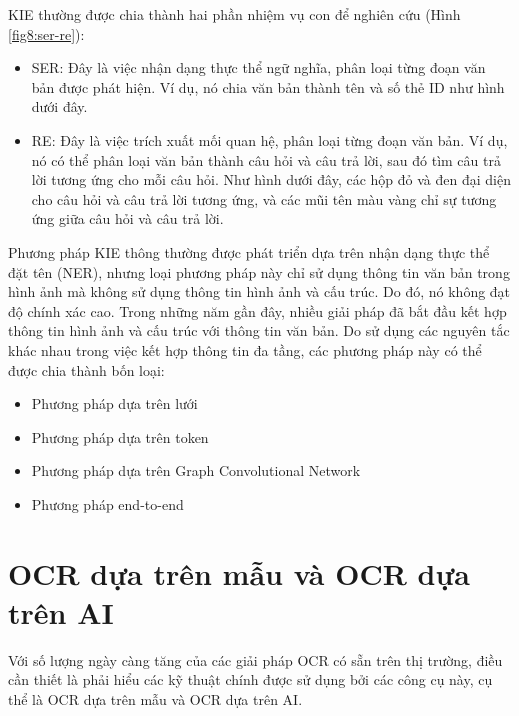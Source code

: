 KIE thường được chia thành hai phần nhiệm vụ con để nghiên cứu (Hình \ref{fig8:ser-re}):
\begin{itemize}
    \item SER: Đây là việc nhận dạng thực thể ngữ nghĩa, phân loại từng đoạn văn bản được phát hiện. Ví dụ, nó chia văn bản thành tên và số thẻ ID như hình dưới đây.
    \item RE: Đây là việc trích xuất mối quan hệ, phân loại từng đoạn văn bản. Ví dụ, nó có thể phân loại văn bản thành câu hỏi và câu trả lời, sau đó tìm câu trả lời tương ứng cho mỗi câu hỏi. Như hình dưới đây, các hộp đỏ và đen đại diện cho câu hỏi và câu trả lời tương ứng, và các mũi tên màu vàng chỉ sự tương ứng giữa câu hỏi và câu trả lời.
\end{itemize}
Phương pháp KIE thông thường được phát triển dựa trên nhận dạng thực thể đặt tên (NER), nhưng loại phương pháp này chỉ sử dụng thông tin văn bản trong hình ảnh mà không sử dụng thông tin hình ảnh và cấu trúc. Do đó, nó không đạt độ chính xác cao. Trong những năm gần đây, nhiều giải pháp đã bắt đầu kết hợp thông tin hình ảnh và cấu trúc với thông tin văn bản. Do sử dụng các nguyên tắc khác nhau trong việc kết hợp thông tin đa tầng, các phương pháp này có thể được chia thành bốn loại:
\begin{itemize}
    \item Phương pháp dựa trên lưới
    \item Phương pháp dựa trên token
    \item Phương pháp dựa trên Graph Convolutional Network
    \item Phương pháp end-to-end
\end{itemize}

\section{OCR dựa trên mẫu và OCR dựa trên AI}
Với số lượng ngày càng tăng của các giải pháp OCR có sẵn trên thị trường, điều cần thiết là phải hiểu các kỹ thuật chính được sử dụng bởi các công cụ này, cụ thể là OCR dựa trên mẫu và OCR dựa trên AI.
